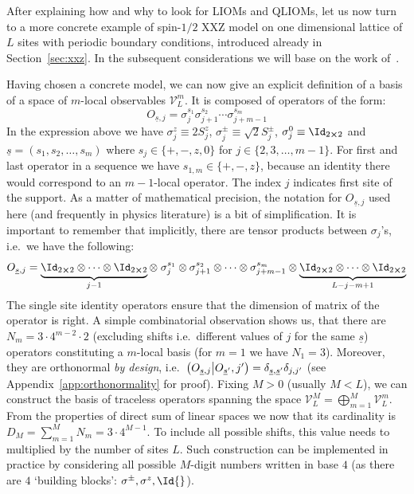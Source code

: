 After explaining how and why to look for LIOMs and QLIOMs, let us now turn to a more concrete
example of spin-\(1/2\) XXZ model on one dimensional lattice of \(L\) sites with periodic
boundary conditions, introduced already in Section~\ref{sec:xxz}. In the subsequent
considerations we will base on the work of~\textcite{Mierzejewski2015a}.

Having chosen a concrete model, we can now give an explicit definition of a basis
of a space of \(m\)-local observables \(\mathcal{V}_L^m\). It is composed of operators
of the form:
\begin{equation}
  O_{\underline{s},j}=\sigma_{j}^{s_{1}} \sigma_{j+1}^{s_{2}} \cdots 
  \sigma_{j+m-1}^{s_{m}}
  \label{eq:basis operator}
\end{equation}
In the expression above we have \(\sigma_j^z \equiv 2 S^z_j\),
\(\sigma_j^{\pm} \equiv \sqrt{2} S_j^{\pm}\), \(\sigma^{0}_j \equiv \Id_{2\cross 2}\) and
 \(\underline{s} = \left(s_1, s_2,\ldots, s_m\right)\) where \(s_j \in \{+,-,z,0\}\) for
 \(j \in \{2,3,\ldots,m-1\}\). For first and last operator in a sequence we have 
 \(s_{1,m} \in \{+,-,z\}\), because an identity there would correspond to an \(m-1\)-local
 operator. The index \(j\) indicates first site of the support.
As a matter of mathematical precision, the notation for \(O_{\underline{s},j}\) used here 
(and frequently in physics literature) is a bit of simplification. It is important to remember
that implicitly, there are tensor products between \(\sigma_j\)'s, i.e.\ we have the following:
\begin{equation}
  O_{\underline{s},j}= \underbrace{\Id_{2\cross 2} \otimes \cdots
       \otimes \Id_{2\cross 2}}_{j-1} \otimes \; \sigma_{j}^{s_{1}} \otimes \sigma_{j+1}^{s_{2}} \otimes
        \cdots \otimes \sigma_{j+m-1}^{s_{m}} \otimes 
        \underbrace{\Id_{2\cross 2} \otimes \cdots \otimes \Id_{2\cross 2}}_{L-j-m+1}
        \label{eq:basis with tensors}
\end{equation}
The single site identity operators ensure that the dimension of matrix of the operator is right.
A simple combinatorial observation shows us, that there are \(N_m = 3\cdot 4^{m-2}\cdot 2\)
(excluding shifts i.e.\ different values of \(j\) for the same \(\underline{s}\)) operators
constituting a \(m\)-local basis (for \(m = 1\) we have \(N_1 = 3\)). Moreover, they are orthonormal
\textit{by design}, i.e.\ \(\left(O_{\underline{s},j} \middle| O_{\underline{s}^{\prime}},j^{\prime}\right) =
\delta_{\underline{s},\underline{s}^{\prime}}\delta_{j,j^{\prime}}\) (see Appendix~\ref{app:orthonormality} for proof).
Fixing \(M>0\) (usually \(M<L\)), we can construct the basis of traceless operators spanning
the space \(\mathcal{V}_L^M = \bigoplus_{m=1}^{M} \mathcal{V}_L^m\). From the properties of 
direct sum of linear spaces we now that its cardinality is \(D_M = \sum_{m=1}^{M} N_m = 
 3 \cdot 4^{M-1}\). To include all possible shifts, this value needs to multiplied by
 the number of sites \(L\). Such construction can be implemented in practice by considering
 all possible \(M\)-digit numbers written in base \(4\) (as there are \(4\) `building blocks':
  \(\sigma^{\pm},\sigma^{z},\Id{}\)). 

